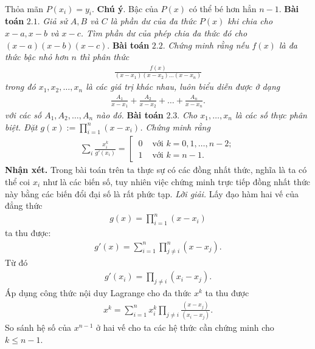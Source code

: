 \begin{multicols}{2}
\begin{align*}
	\end{align*}
	Thỏa mãn $P(x_i)=y_i$.
	\vskip 0.1cm
	\textbf{\color{hoccungpi}Chú ý}. Bậc của $P(x)$  có thể bé hơn hẳn $n-1$.
	\vskip 0.1cm
	\textbf{\color{hoccungpi}Bài toán} $\pmb{2.1.}$ \textit{Giả sử $A, B$ và $C$ là phần dư của đa thức $P(x)$ khi chia cho $x-a,x-b$ và $x-c$.
		Tìm phần dư của phép chia đa thức đó cho $(x-a)(x-b)(x-c).$}
	\vskip 0.1cm
	\textbf{\color{hoccungpi}Bài toán} $\pmb{2.2.}$ \textit{Chứng minh rằng nếu $f(x)$ là đa thức bậc nhỏ
		hơn $n$ thì phân thức
		\begin{align*}
			\frac{f(x)}{(x-x_1)(x-x_2)\ldots (x-x_n)}
		\end{align*}
		trong đó $x_1, x_2, \ldots, x_n$ là các giá trị khác nhau, 
		luôn biểu diễn được ở dạng
		\begin{align*}
			\frac{A_1}{x-x_1}+\frac{A_2}{x-x_2}+\ldots +\frac{A_n}{x-x_n}.
		\end{align*}
		với các số $  A_1, A_2,\ldots, A_n$ nào đó.} 
	\vskip 0.1cm
	\textbf{\color{hoccungpi}Bài toán} $\pmb{2.3.}$ \textit{Cho $x_1,\ldots,x_n$ là các số thực phân biệt. Đặt  $g(x):=\prod_{i=1}^n(x-x_i)$. Chứng minh rằng}
	\begin{align*}
		\sum_i\frac{x_i^k}{g'(x_i)}=\left[\
		\begin{array}{ll}0&\text{ với } k=0,1,\ldots,n-2;\\
			1& \text{ với } k=n-1.\end{array}\right. 
	\end{align*}
	\textbf{\color{hoccungpi}Nhận xét.} Trong bài toán trên ta thực sự có các đồng nhất thức, nghĩa là ta có thể coi $x_i$ như là các biến số, tuy nhiên việc chứng minh trực tiếp đồng nhất thức này bằng các biến đổi đại số là rất phức tạp.  
	\vskip 0.1cm
	\textit{Lời giải.} 
	Lấy đạo hàm hai vế của đẳng thức 
	\begin{align*}
			g(x)=\prod_{i=1}^n(x-x_i)  \tag{$2$}
	\end{align*}
	ta thu được:
	\begin{align*}
		g'(x)=\sum_{i=1}^n\prod_{j\neq i}^n(x-x_j).
	\end{align*}  
	Từ đó
	\begin{align*}
		g'(x_i)=\prod_{j\neq i}(x_i-x_j). \tag{$3$}
	\end{align*}
	Áp dụng công thức nội duy Lagrange cho  đa thức $x^k$ ta thu được
	\begin{align*}
		x^k= \sum_{i=1}^nx_i^k\prod_{j\neq i}\frac{(x-x_j)}{ (x_i-x_j)}.
	\end{align*}
	So sánh hệ số của $x^{n-1}$ ở hai vế cho ta các hệ thức cần chứng minh cho $k\leq n-1$.

\end{multicols}

